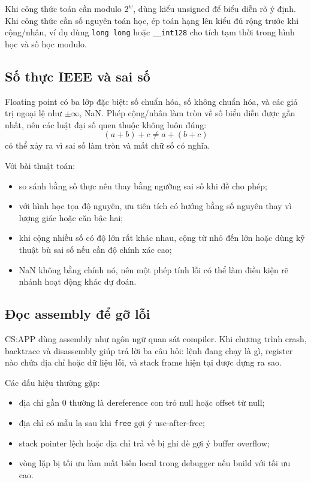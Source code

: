 \documentclass[11pt]{article}
\begin{document}
Khi công thức toán cần modulo \(2^w\), dùng kiểu unsigned để biểu diễn rõ ý
định. Khi công thức cần số nguyên toán học, ép toán hạng lên kiểu đủ rộng trước
khi cộng/nhân, ví dụ dùng \texttt{long long} hoặc \texttt{\_\_int128} cho tích
tạm thời trong hình học và số học modulo.

\subsection{Số thực IEEE và sai số}

Floating point có ba lớp đặc biệt: số chuẩn hóa, số không chuẩn hóa, và các giá
trị ngoại lệ như \(\pm\infty\), NaN. Phép cộng/nhân làm tròn về số biểu diễn
được gần nhất, nên các luật đại số quen thuộc không luôn đúng:
\[
  (a+b)+c \ne a+(b+c)
\]
có thể xảy ra vì sai số làm tròn và mất chữ số có nghĩa.

Với bài thuật toán:
\begin{itemize}
  \item so sánh bằng số thực nên thay bằng ngưỡng sai số khi đề cho phép;
  \item với hình học tọa độ nguyên, ưu tiên tích có hướng bằng số nguyên thay
        vì lượng giác hoặc căn bậc hai;
  \item khi cộng nhiều số có độ lớn rất khác nhau, cộng từ nhỏ đến lớn hoặc
        dùng kỹ thuật bù sai số nếu cần độ chính xác cao;
  \item NaN không bằng chính nó, nên một phép tính lỗi có thể làm điều kiện
        rẽ nhánh hoạt động khác dự đoán.
\end{itemize}

\subsection{Đọc assembly để gỡ lỗi}

CS:APP dùng assembly như ngôn ngữ quan sát compiler. Khi chương trình crash,
backtrace và disassembly giúp trả lời ba câu hỏi: lệnh đang chạy là gì, register
nào chứa địa chỉ hoặc dữ liệu lỗi, và stack frame hiện tại được dựng ra sao.

Các dấu hiệu thường gặp:
\begin{itemize}
  \item địa chỉ gần 0 thường là dereference con trỏ null hoặc offset từ null;
  \item địa chỉ có mẫu lạ sau khi \texttt{free} gợi ý use-after-free;
  \item stack pointer lệch hoặc địa chỉ trả về bị ghi đè gợi ý buffer overflow;
  \item vòng lặp bị tối ưu làm mất biến local trong debugger nếu build với tối
        ưu cao.
\end{itemize}
\end{document}
